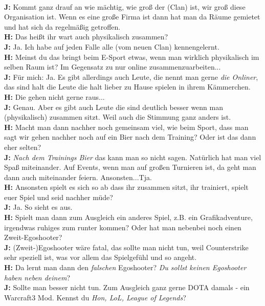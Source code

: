 \\ \textbf{J:} Kommt ganz drauf an wie mächtig, wie groß der (Clan) ist, wir groß diese Organisation ist. Wenn es eine große Firma ist dann hat man da  Räume gemietet und hat sich da regelmäßig getroffen.
\\ \textbf{H:} Das heißt ihr wart auch physikalisch zusammen?
\\ \textbf{J:} Ja. Ich habe auf jeden Falle alle (vom neuen Clan) kennengelernt.
\\ \textbf{H:} Meinst du das bringt beim E-Sport etwas, wenn man wirklich physikalisch im selben Raum ist? Im Gegensatz zu nur online zusammenzuarbeiten...
\\ \textbf{J:} Für mich: Ja. Es gibt allerdings auch Leute, die nennt man gerne \textit{die Onliner}, das sind halt die Leute die halt lieber zu Hause spielen in ihrem Kämmerchen.
\\ \textbf{H:} Die gehen nicht gerne raus...
\\ \textbf{J:} Genau. Aber es gibt auch Leute die sind deutlich besser wenn man (physikalisch) zusammen sitzt. Weil auch die Stimmung ganz anders ist.
\\ \textbf{H:} Macht man dann nachher noch gemeinsam viel, wie beim Sport, dass man sagt wir gehen nachher noch auf ein Bier nach dem Training? Oder ist das dann eher selten?
\\ \textbf{J:} \textit{Nach dem Trainings Bier} das kann man so nicht sagen. Natürlich hat man viel Spaß miteinander. Auf Events, wenn man auf großen Turnieren ist, da geht man dann auch miteinander feiern. Ansonsten...Tja.
\\ \textbf{H:} Ansonsten spielt es sich so ab dass ihr zusammen sitzt, ihr trainiert, spielt euer Spiel und seid nachher müde?
\\ \textbf{J:} Ja. So sieht es aus.
\\ \textbf{H:} Spielt man dann zum Ausgleich ein anderes Spiel, z.B. ein Grafikadventure, irgendwas ruhiges zum runter kommen? Oder hat man nebenbei noch einen Zweit-Egoshooter?
\\ \textbf{J:} (Zweit-)Egoshooter wäre fatal, das sollte man nicht tun, weil Counterstrike sehr speziell ist, was vor allem das Spielgefühl und so angeht.
\\ \textbf{H:} Da lernt man dann den \textit{falschen} Egoshooter? \textit{Du sollst keinen Egoshooter haben neben deinem}?
\\ \textbf{J:} Sollte man besser nicht tun. Zum Ausgleich ganz gerne DOTA damals - ein Warcraft3 Mod. Kennst du \textit{Hon, LoL, League of Legends}?

